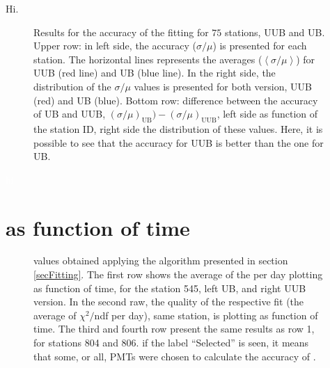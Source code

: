 \documentclass[twoside, final, 10pt]{articleMine}
\begin{document}
Hi.
\clearpage


\begin{figure}[!t]
  \centering
  \caption{Results for the accuracy of the \qpkvem fitting for
  $75$ stations, UUB and UB. Upper row: in left side, the
  accuracy ($\sigma/\mu$) is presented for each station. The
  horizontal lines represents the averages ($\left< \sigma/\mu
  \right>$) for UUB (red line) and UB (blue line). In the right
  side, the distribution of the $\sigma/\mu$ values is presented
  for both version, UUB (red) and UB (blue). Bottom row:
  difference between the accuracy of UB and UUB,
  $\left(\sigma/\mu\right)_{\mathrm{UB}})-\left(\sigma/\mu\right)_{\mathrm{UUB}}$,
  left side as function of the station ID, right side the
  distribution of these values. Here, it is possible to see that
  the accuracy for UUB is better than the one for UB.}
  \label{figAccuracyResults}
\end{figure}
\textcolor{white}{hi}
\clearpage

\section{\qpkvem as function of time}
\label{secQpkVsTime}

\begin{figure}[!b]
  \centering
  \caption{\qpkvem values obtained applying the algorithm
  presented in section \ref{secFitting}. The first row shows the
  average of the \qpkvem per day plotting as function of time,
  for the station  545, left UB, and right UUB version. In the
  second raw, the quality of the respective fit (the average of
  $\chi^2/$ndf per day), same station, is plotting as function of
  time. The third and fourth row present the same results as row
  1, for stations 804 and 806. if the label ``Selected'' is seen,
  it means that some, or all, PMTs were chosen to calculate the
  accuracy of \qpkvem.}
\end{figure}
\clearpage
\end{document}
